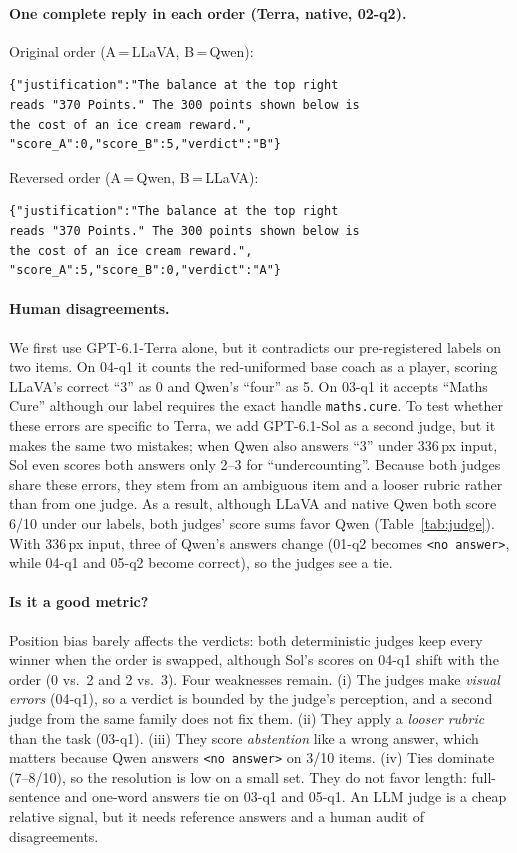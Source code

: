\documentclass[10pt,twocolumn,letterpaper]{article}
\newcommand{\noans}{\texttt{\textless no answer\textgreater}}
\begin{document}
\paragraph{One complete reply in each order (Terra, native, 02-q2).} Original order (A\,=\,LLaVA, B\,=\,Qwen):
{\small\begin{verbatim}
{"justification":"The balance at the top right
reads "370 Points." The 300 points shown below is
the cost of an ice cream reward.",
"score_A":0,"score_B":5,"verdict":"B"}
\end{verbatim}}
\noindent Reversed order (A\,=\,Qwen, B\,=\,LLaVA):
{\small\begin{verbatim}
{"justification":"The balance at the top right
reads "370 Points." The 300 points shown below is
the cost of an ice cream reward.",
"score_A":5,"score_B":0,"verdict":"A"}
\end{verbatim}}

\paragraph{Human disagreements.} We first use GPT-6.1-Terra alone, but it contradicts our pre-registered labels on two items. On 04-q1 it counts the red-uniformed base coach as a player, scoring LLaVA's correct ``3'' as 0 and Qwen's ``four'' as 5. On 03-q1 it accepts ``Maths Cure'' although our label requires the exact handle \texttt{maths.cure}. To test whether these errors are specific to Terra, we add GPT-6.1-Sol as a second judge, but it makes the same two mistakes; when Qwen also answers ``3'' under 336\,px input, Sol even scores both answers only 2--3 for ``undercounting''. Because both judges share these errors, they stem from an ambiguous item and a looser rubric rather than from one judge. As a result, although LLaVA and native Qwen both score 6/10 under our labels, both judges' score sums favor Qwen (Table~\ref{tab:judge}). With 336\,px input, three of Qwen's answers change (01-q2 becomes \noans, while 04-q1 and 05-q2 become correct), so the judges see a tie.

\paragraph{Is it a good metric?} Position bias barely affects the verdicts: both deterministic judges keep every winner when the order is swapped, although Sol's scores on 04-q1 shift with the order (0 vs.\ 2 and 2 vs.\ 3). Four weaknesses remain. (i) The judges make \emph{visual errors} (04-q1), so a verdict is bounded by the judge's perception, and a second judge from the same family does not fix them. (ii) They apply a \emph{looser rubric} than the task (03-q1). (iii) They score \emph{abstention} like a wrong answer, which matters because Qwen answers \noans{} on 3/10 items. (iv) Ties dominate (7--8/10), so the resolution is low on a small set. They do not favor length: full-sentence and one-word answers tie on 03-q1 and 05-q1. An LLM judge is a cheap relative signal, but it needs reference answers and a human audit of disagreements.
\end{document}
